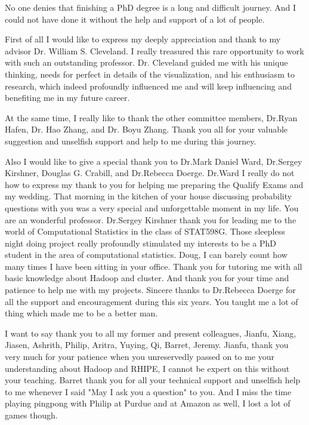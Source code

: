 \begin{acknowledgments}

No one denies that finishing a PhD degree is a long and difficult journey. And I 
could not have done it without the help and support of a lot of people.

First of all I would like to express my deeply appreciation and thank to my 
advisor Dr. William S. Cleveland. I really treasured this rare opportunity to 
work with such an outstanding professor. Dr. Cleveland guided me with his unique 
thinking, needs for perfect in details of the visualization, and his enthusiasm 
to research, which indeed profoundly influenced me and will keep influencing and
benefiting me in my future career.

At the same time, I really like to thank the other committee members, Dr.Ryan 
Hafen, Dr. Hao Zhang, and Dr. Boyu Zhang. Thank you all for your valuable 
suggestion and unselfish support and help to me during this journey.

Also I would like to give a special thank you to Dr.Mark Daniel Ward, Dr.Sergey
Kirshner, Douglas G. Crabill, and Dr.Rebecca Doerge. Dr.Ward I really do not how 
to express my thank to you for helping me preparing the Qualify Exams and my 
wedding. That morning in the kitchen of your house discussing probability questions 
with you was a very special and unforgettable moment in my life. You are an 
wonderful professor. Dr.Sergey Kirshner thank you for leading me to the world of 
Computational Statistics in the class of STAT598G. Those sleepless night doing 
project really profoundly stimulated my interests to be a PhD student in the area 
of computational statistics. Doug, I can barely count how many times I have been
sitting in your office. Thank you for tutoring me with all basic 
knowledge about Hadoop and cluster. And thank you for your time and patience to 
help me with my projects. Sincere thanks to Dr.Rebecca Doerge for all the support 
and encouragement during this six years. You taught me a lot of thing which made 
me to be a better man.

I want to say thank you to all my former and present colleagues, Jianfu, Xiang, 
Jiasen, Ashrith, Philip, Aritra, Yuying, Qi, Barret, Jeremy. Jianfu, thank you 
very much for your patience when you unreservedly passed on to me your 
understanding about Hadoop and RHIPE, I cannot be expert on this without your 
teaching. Barret thank you for all your technical support and unselfish help to 
me whenever I said "May I ask you a question" to you. And I miss the time playing
pingpong with Philip at Purdue and at Amazon as well, I lost a lot of games though.


\end{acknowledgments}
